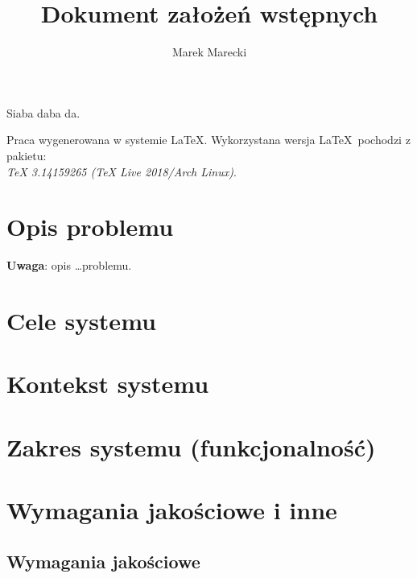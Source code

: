 \documentclass[11pt,oneside,a4paper,titlepage,onecolumn]{article}
\author{Marek Marecki}
\title{Dokument założeń wstępnych}
\begin{document}
\maketitle

\begin{center}
    Siaba daba da.
\end{center}

Praca wygenerowana w systemie \LaTeX.
Wykorzystana wersja \LaTeX~pochodzi z pakietu:\\ \emph{TeX 3.14159265 (TeX Live 2018/Arch Linux)}.

\tableofcontents

\newpage

\section{Opis problemu}
\label{opis_problemu}

\textbf{Uwaga}: opis {\small\ldots problemu}.


\section{Cele systemu}

\section{Kontekst systemu}

\section{Zakres systemu (funkcjonalność)}

\section{Wymagania jakościowe i inne}

\subsection{Wymagania jakościowe}
\end{document}
